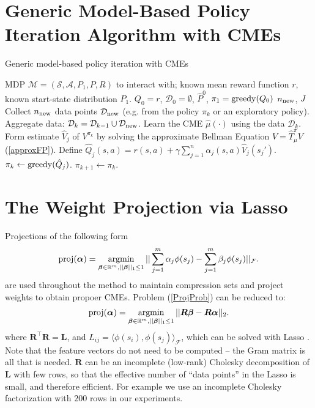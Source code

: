 \documentclass[letterpaper]{article}
\newcommand{\ShaweTaylorBook}{DBLP:books/daglib/0026002}
\newcommand{\TibshiraniLasso}{tibshirani96regression}
\newcommand{\cD}{{\mathcal D}}
\newcommand{\cF}{{\mathcal F}}
\newcommand{\cA}{{\mathcal A}}
\newcommand{\cS}{{\mathcal S}}
\newcommand{\cM}{{\mathcal M}}
\newcommand{\balpha}{{\bm \alpha}}
\newcommand{\bbeta}{{\bm \beta}}
\newcommand{\bL}{{\bm L}}
\newcommand{\bR}{{\bm R}}
\newcommand{\R}{{\mathbb R}}
\newcommand{\argmin}{\operatornamewithlimits{argmin}}
\newcommand{\greedy}{\operatornamewithlimits{greedy}}
\newcommand{\lang}{\langle}
\newcommand{\rang}{\rangle}
\newcommand{\nn}{\nonumber}
\begin{document}
\clearpage

\appendix

\section{Generic Model-Based Policy Iteration Algorithm with CMEs} \label{GenericAlg}

\begin{algorithm}[htb]
   \caption{Generic model-based policy iteration with CMEs}
   \label{GenericPolIt}
\begin{algorithmic}
    MDP $\cM = (\cS,\cA,P_1,P,R)$ to interact with; known mean reward function $r$, known start-state distribution $P_1$.
	  $Q_0=r$, $\cD_0 = \emptyset$, $\hat P^0$, $\pi_1 = \greedy(Q_0)$
    $n_{\rm new}$, $J$\\
	  Collect $n_{\rm new}$ data points $\cD_{\rm new}$ (e.g. from the policy $\pi_k$ or an exploratory policy). Aggregate data: $\cD_k = \cD_{k-1}\cup\cD_{\rm new}$.
	  Learn the CME $\hat \mu(\cdot)$ using the data $\cD_k$.
    Form estimate $\hat V_j$ of $V^{\pi_k}$ by solving the approximate Bellman Equation $V =  \hat T^\pi_{\hat \mu} V$ (\ref{approxFP}). Define $\hat Q_j(s,a) = r(s,a) + \gamma \sum_{j=1}^n \alpha_j(s,a) \hat V_j(s_j')$.
	  $\pi_{k} \leftarrow \greedy(\hat Q_j)$. 
   \ENDFOR
	 \STATE $\pi_{k+1} \leftarrow \pi_{k} $.
	\ENDFOR
\end{algorithmic}
\end{algorithm}

\section{The Weight Projection via Lasso} \label{LassoSec}

Projections of the following form
\begin{align}
{\rm proj}(\balpha) = \argmin_{\bbeta \in \R^m, ||\bbeta||_1\le 1} || \sum_{j=1}^m \alpha_j \phi(s_j) - \sum_{j=1}^m \beta_j  \phi(s_j)  ||_{\cF}. \label{ProjProb}
\end{align}
are used throughout the method to maintain compression sets and project weights to obtain propoer CMEs. Problem (\ref{ProjProb}) can be reduced to:
\begin{align}
{\rm proj}(\balpha)  = \argmin_{\bbeta \in \R^m, ||\bbeta||_1\le 1} || \bR \bbeta - \bR \balpha ||_2. \nn
\end{align}
where $\bR^\top \bR = \bL$, and $L_{ij} = \lang \phi(s_i), \phi(s_j)\rang_\cF$, which can be solved with Lasso \citep{\TibshiraniLasso}. Note that the feature vectors do not need to be computed -- the Gram matrix is all that is needed. $\bR$ can be an incomplete  (low-rank) Cholesky decomposition \cite[see e.g.][]{\ShaweTaylorBook} of $\bL$ with few rows, so that the effective number of ``data points'' in the Lasso is small, and therefore efficient. For example we use an incomplete Cholesky factorization with $200$ rows in our experiments.
\end{document}
